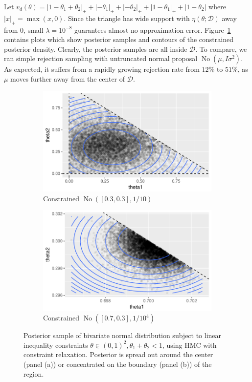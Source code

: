 \documentclass[10pt,fleqn]{article}
\newcommand{\mc}[1]{\mathcal{#1}}
\DeclareMathOperator{\No}{No}
\DeclareMathOperator{\1}{\mathbbm{1}}
\begin{document}
Let $v_d(\theta)=|1-\theta_1+\theta_2|_+ + |-\theta_1|_+ + |-\theta_2|_+ +|1-\theta_1|_+ +|1-\theta_2| $ where $|x|_+ = \max(x,0)$.  Since the triangle has wide support with $\eta(\theta;\mc D)$ away from $0$, small $\lambda=10^{-8}$
 guarantees almost no approximation error. Figure~\ref{linear_inequality} contains plots which show posterior samples and contours of the constrained posterior density. Clearly, the posterior samples are all inside
$\mc D$. To compare, we ran simple rejection sampling with untruncated normal proposal $\No ( \mu, I\sigma^2)$. As expected, it  suffers from a rapidly growing rejection rate from $12\%$ to $51\%$, as $\mu$ moves further away from the center of $\mc D$.

\begin{figure}[H]
\begin{subfigure}[b]{0.45\textwidth}
\includegraphics[width=1\textwidth]{linear_inequal_1}
\caption{Constrained $\No([0.3,0.3],1/{10})$}
\end{subfigure}
\begin{subfigure}[b]{0.45\textwidth}
\includegraphics[width=1\textwidth]{linear_inequal_2}
\caption{Constrained $\No([0.7,0.3],1/{10^4})$}
\end{subfigure}
\caption{Posterior sample of bivariate normal distribution subject to linear inequality constraints $\theta\in(0,1)^2,\theta_1+\theta_2<1$, using HMC with  constraint relaxation. Posterior is spread out around the center (panel (a)) or concentrated on the boundary (panel (b)) of the region.}
\label{linear_inequality}
\end{figure}
\end{document}
